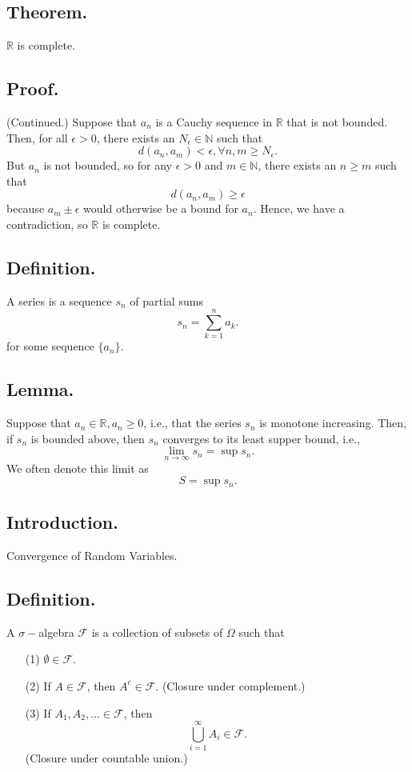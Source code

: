 \documentclass[titlepage]{article}
\begin{document}
\subsection{Theorem.} $\mathbb{R}$ is complete.

\subsection{Proof.} (Continued.) Suppose that $a_{n}$ is a Cauchy sequence in $\mathbb{R}$ that is not bounded. Then, for all $\epsilon > 0$, there exists an $N_{\epsilon} \in \mathbb{N}$ such that
$$d(a_{n}, a_{m}) < \epsilon, \forall n,m \geq N_{\epsilon}.$$
But $a_{n}$ is not bounded, so for any $\epsilon > 0$ and $m \in \mathbb{N}$, there exists an $n \geq m$ such that 
$$d(a_{n}, a_{m}) \geq \epsilon$$
because $a_{m} \pm \epsilon$ would otherwise be a bound for $a_{n}$. Hence, we have a contradiction, so $\mathbb{R}$ is complete.

\subsection{Definition.} A series is a sequence $s_{n}$ of partial sums 
$$s_{n} = \sum_{k=1}^{n}a_{k}.$$
for some sequence $\{a_{n}\}$.

\subsection{Lemma.} Suppose that $a_{n} \in \mathbb{R}, a_{n} \geq 0$, i.e., that the series $s_{n}$ is monotone increasing. Then, if $s_{n}$ is bounded above, then $s_{n}$ converges to its least supper bound, i.e., 
$$\lim_{n \to \infty}s_{n} = \sup s_{n}.$$
We often denote this limit as 
$$S = \sup s_{n}.$$

\newpage {}

\subsection{Introduction.} Convergence of Random Variables.

\subsection{Definition.} A $\sigma-$algebra $\mathcal{F}$ is a collection of subsets of $\Omega$ such that 
\begin{enumerate}
\item[(1)] $\emptyset \in \mathcal{F}$.
\item[(2)] If $A \in \mathcal{F}$, then $A^{c} \in \mathcal{F}$. (Closure under complement.)
\item[(3)] If $A_{1}, A_{2}, \ldots \in \mathcal{F}$, then 
$$\bigcup_{i=1}^{\infty}A_{i} \in \mathcal{F}.$$
(Closure under countable union.)
\end{enumerate}
\end{document}
